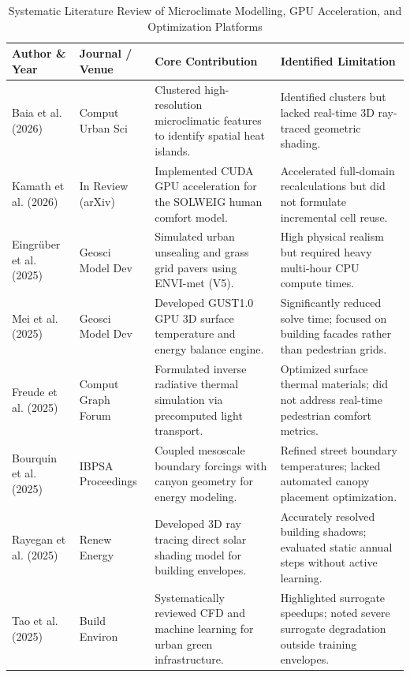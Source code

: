 \documentclass[conference]{IEEEtran}
\begin{document}
\begin{table}[!t]
\caption{Systematic Literature Review of Microclimate Modelling, GPU Acceleration, and Optimization Platforms}
\label{tab:lit_review}
\centering
\scriptsize
\renewcommand{\arraystretch}{0.98}
\setlength{\tabcolsep}{3pt}
\begin{tabularx}{\textwidth}{@{}p{2.6cm} p{2.2cm} Y Y@{}}
\toprule
\textbf{Author \& Year} & \textbf{Journal / Venue} & \textbf{Core Contribution} & \textbf{Identified Limitation} \\
\midrule
Baia et al. (2026) \cite{baia2026scalable} & Comput Urban Sci & Clustered high-resolution microclimatic features to identify spatial heat islands. & Identified clusters but lacked real-time 3D ray-traced geometric shading. \\
Kamath et al. (2026) \cite{kamath2026solweig} & In Review (arXiv) & Implemented CUDA GPU acceleration for the SOLWEIG human comfort model. & Accelerated full-domain recalculations but did not formulate incremental cell reuse. \\
Eingrüber et al. (2025) \cite{eingruber2025simulation} & Geosci Model Dev & Simulated urban unsealing and grass grid pavers using ENVI-met (V5). & High physical realism but required heavy multi-hour CPU compute times. \\
Mei et al. (2025) \cite{mei2025gust1} & Geosci Model Dev & Developed GUST1.0 GPU 3D surface temperature and energy balance engine. & Significantly reduced solve time; focused on building facades rather than pedestrian grids. \\
Freude et al. (2025) \cite{freude2025inverse} & Comput Graph Forum & Formulated inverse radiative thermal simulation via precomputed light transport. & Optimized surface thermal materials; did not address real-time pedestrian comfort metrics. \\
Bourquin et al. (2025) \cite{bourquin2025improved} & IBPSA Proceedings & Coupled mesoscale boundary forcings with canyon geometry for energy modeling. & Refined street boundary temperatures; lacked automated canopy placement optimization. \\
Rayegan et al. (2025) \cite{rayegan2025development} & Renew Energy & Developed 3D ray tracing direct solar shading model for building envelopes. & Accurately resolved building shadows; evaluated static annual steps without active learning. \\
Tao et al. (2025) \cite{tao2025integrating} & Build Environ & Systematically reviewed CFD and machine learning for urban green infrastructure. & Highlighted surrogate speedups; noted severe surrogate degradation outside training envelopes. \\

\end{tabularx}
\end{table}
\end{document}
